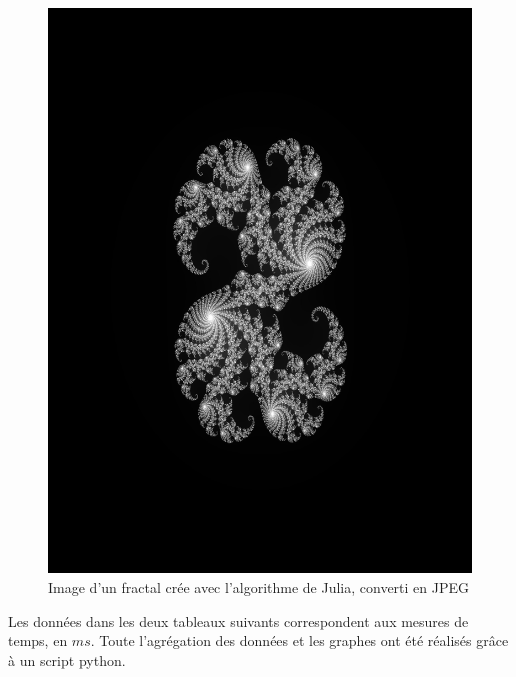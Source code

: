 \documentclass[12pt,a4paper,oneside, titlepage]{report}
\begin{document}
		\begin{figure}[H]
			\centering
			\includegraphics[scale=0.20]{images/julia_thread_simple}
			\caption {Image d'un fractal crée avec l'algorithme de Julia, converti en JPEG}
		\end{figure}

		\newpage

		 Les données dans les deux tableaux suivants correspondent aux mesures de temps, en $ms$. Toute l'agrégation des données et les graphes ont été réalisés grâce à un script python.
\end{document}
